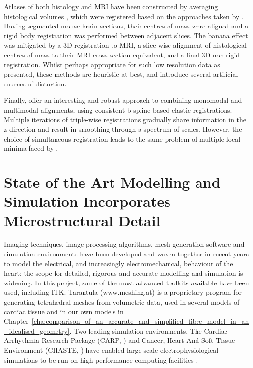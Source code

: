   Atlases of both histology and MRI have been constructed by averaging histological volumes \cite{Li2009}, which were registered based on the approaches taken by \cite{Malandain2004,Yushkevich2006}. Having segmented mouse brain sections, their centres of mass were aligned and a rigid body registration was performed between adjacent slices. The banana effect was mitigated by a 3D registration to MRI, a slice-wise alignment of histological centres of mass to their MRI cross-section equivalent, and a final 3D non-rigid registration. Whilst perhaps appropriate for such low resolution data as presented, these methods are heuristic at best, and introduce several artificial sources of distortion.
  
  Finally, \cite{Arganda-Carreras2010} offer an interesting and robust approach to combining monomodal and multimodal alignments, using consistent b-spline-based elastic registrations. Multiple iterations of triple-wise registrations gradually share information in the z-direction and result in smoothing through a spectrum of scales. However, the choice of simultaneous registration leads to the same problem of multiple local minima faced by \cite{Palm2008,Feuerstein2011}.

\section{State of the Art Modelling and Simulation Incorporates Microstructural Detail} %
\label{sec:the_state_of_the_art_in_microstructural_modelling_and_simulation_incorporates_microstructural_detail}
  Imaging techniques, image processing algorithms, mesh generation software \cite{Prassl2009} and simulation environments have been developed and woven together in recent years to model the electrical, and increasingly electromechanical, behaviour of the heart; the scope for detailed, rigorous and accurate modelling and simulation is widening. In this project, some of the most advanced toolkits available have been used, including ITK. Tarantula (www.meshing.at) is a proprietary program for generating tetrahedral meshes from volumetric data, used in several models of cardiac tissue \cite{Bernabeu2008,Bishop2006,Plank2009} and in our own models in Chapter~\ref{cha:comparison_of_an_accurate_and_simplified_fibre_model_in_an_idealised_geometry}. Two leading simulation environments, The Cardiac Arrhythmia Research Package (CARP, \cite{Vigmond2003}) and Cancer, Heart And Soft Tissue Environment (CHASTE, \cite{Pitt-Francis2008, Pitt-Francis2009, Pitt-Francis2009a}) have enabled large-scale electrophysiological simulations to be run on high performance computing facilities \cite{Bernabeu2008}.
  
